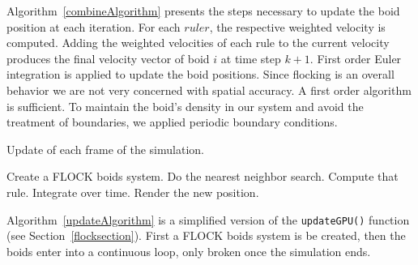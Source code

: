Algorithm~\ref{combineAlgorithm} presents the steps necessary to update the boid position at each iteration. For each $rule r$, the respective weighted velocity is computed. Adding the weighted velocities of each rule to the current velocity produces the final velocity vector of boid $i$ at time step $k+1$. First order Euler integration is applied to update the boid positions. Since flocking is an overall behavior we are not very concerned with spatial accuracy. A first order algorithm is sufficient. To maintain the boid's density in our system and avoid the treatment of boundaries, we applied periodic boundary conditions.
 
\begin{algorithm}
\caption{Update of each frame of the simulation.}
\label{updateAlgorithm}
\begin{algorithmic}
\STATE Create a FLOCK boids system.
\STATE Do the nearest neighbor search.
\STATE Compute that rule.
\STATE Integrate over time.
\STATE Render the new position.
\ENDFOR
\end{algorithmic}
\end{algorithm}

Algorithm~\ref{updateAlgorithm} is a simplified version of the \texttt{updateGPU()} function (see Section~\ref{flocksection}). First a FLOCK boids system is be created, then the boids enter into a continuous loop, only broken once the simulation ends. 
